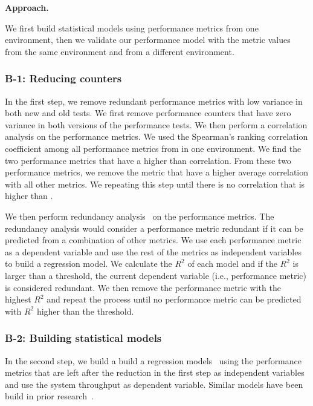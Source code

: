 \noindent \textbf{Approach. }

We first build statistical models using performance metrics from one environment, then we validate our performance model with the metric values from the same environment and from a different environment.
\subsubsection{B-1: Reducing counters}

In the first step, we remove redundant performance metrics with low variance in both new and old tests. We first remove performance counters that have zero variance in both versions of the performance tests. We then perform a correlation analysis on the performance metrics. We used the Spearman's ranking correlation coefficient among all performance metrics from in one environment. We find the two performance metrics that have a higher than  correlation. From these two performance metrics, we remove the metric that have a higher average correlation with all other metrics. We repeating this step until there is no correlation that is higher than .

We then perform redundancy analysis~\cite{harrell2001regression} on the performance metrics. The redundancy analysis would consider a performance metric redundant if it can be predicted from a combination of other metrics. We use each performance metric as a dependent variable and use the rest of the metrics as independent variables to build a regression model. We calculate the $R^2$ of each model and if the $R^2$ is larger than a threshold, the current dependent variable (i.e., performance metric) is considered redundant. We then remove the performance metric with the highest $R^2$ and repeat the process until no performance metric can be predicted with $R^2$ higher than the threshold.

\subsubsection{B-2: Building statistical models}

In the second step, we build a build a regression models~\cite{freedman2009statistical} using the performance metrics that are left after the reduction in the first step as independent variables and use the system throughput as dependent variable. Similar models have been build in prior research~\cite{cohen,vperfgard}.

